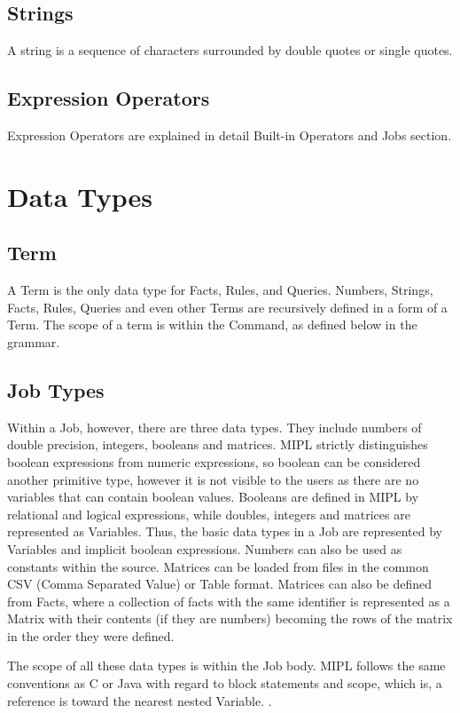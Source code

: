 \documentclass[prodmode,acmtecs]{acmsmall}
\begin{document}
\subsection{Strings}

A string is a sequence of characters surrounded by double quotes or single
quotes.
\medskip

\subsection{Expression Operators}
Expression Operators are explained in detail Built-in Operators and Jobs section.
\medskip

\section{Data Types}

\subsection {Term}
A Term is the only data type for Facts, Rules, and Queries.  Numbers, Strings,
Facts, Rules, Queries and even other Terms are recursively defined in a form of a Term. 
The scope of a term is within the Command, as defined below in the grammar.

\subsection {Job Types}
Within a Job, however, there are three  data types. They include numbers of double precision, integers, booleans and
matrices. MIPL strictly distinguishes boolean expressions from numeric expressions, so boolean can be
considered another primitive type, however it is not visible to the users
as there are no variables that can contain boolean values. Booleans are defined in MIPL by relational and logical expressions, while doubles,
integers and matrices are represented as Variables. Thus, the basic data types in a Job are represented by Variables 
and implicit boolean expressions. Numbers can also be used as constants
within the source. Matrices can be loaded from files in the common CSV (Comma Separated Value)
or Table format. Matrices can also be defined from Facts, where a collection of facts with the
same identifier is represented as a Matrix with their contents (if they are numbers)
becoming the rows of the matrix in the order they were defined. 

The scope of all these data types is within the Job body. MIPL follows the same conventions as C or Java with regard
to block statements and scope, which is, a reference is toward the nearest nested Variable.
\medskip.
\end{document}
